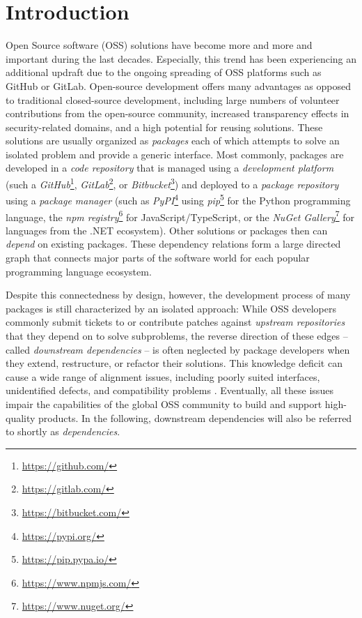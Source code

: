 \section{Introduction}
\label{sec:introduction}

Open Source software (OSS) solutions have become more and more and important during the last decades.
Especially, this trend has been experiencing an additional updraft due to the ongoing spreading of OSS platforms such as GitHub or GitLab.
Open-source development offers many advantages as opposed to traditional closed-source development, including large numbers of volunteer contributions from the open-source community, increased transparency effects in security-related domains, and a high potential for reusing solutions.
These solutions are usually organized as \emph{packages} each of which attempts to solve an isolated problem and provide a generic interface.
Most commonly, packages are developed in a \emph{code repository} that is managed using a \emph{development platform} (such a \emph{GitHub}\footnote{\url{https://github.com/}}, \emph{GitLab}\footnote{\url{https://gitlab.com/}}, or \emph{Bitbucket}\footnote{\url{https://bitbucket.com/}}) and deployed to a \emph{package repository} using a \emph{package manager} (such as \emph{PyPI}\footnote{\url{https://pypi.org/}} using \emph{pip}\footnote{\url{https://pip.pypa.io/}} for the Python programming language, the \emph{npm registry}\footnote{\url{https://www.npmjs.com/}} for JavaScript/TypeScript, or the \emph{NuGet Gallery}\footnote{\url{https://www.nuget.org/}} for languages from the .NET ecosystem).
Other solutions or packages then can \emph{depend} on existing packages.
These dependency relations form a large directed graph that connects major parts of the software world for each popular programming language ecosystem.

Despite this connectedness by design, however, the development process of many packages is still characterized by an isolated approach:
While OSS developers commonly submit tickets to or contribute patches against \emph{upstream repositories} that they depend on to solve subproblems, the reverse direction of these edges -- called \emph{downstream dependencies} -- is often neglected by package developers when they extend, restructure, or refactor their solutions.
This knowledge deficit can cause a wide range of alignment issues, including poorly suited interfaces, unidentified defects, and compatibility problems \citep[see][]{bogart2015breaks}.
Eventually, all these issues impair the capabilities of the global OSS community to build and support high-quality products.
In the following, downstream dependencies will also be referred to shortly as \emph{dependencies}.

